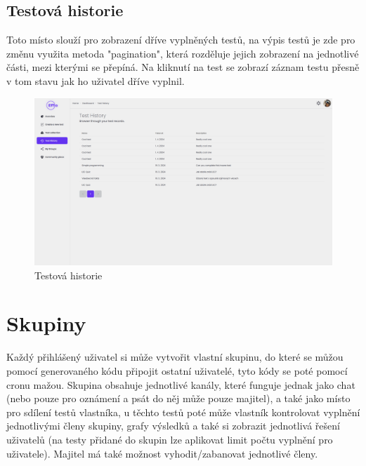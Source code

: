 \documentclass[12pt, a4paper,
openright
]{report}
\begin{document}
\subsection{Testová historie}
\label{subsec:historie}
Toto místo slouží pro zobrazení dříve vyplněných testů, na výpis testů je zde pro změnu využita metoda "pagination", která rozděluje jejich zobrazení na jednotlivé části, mezi kterými se přepíná. Na kliknutí na test se zobrazí záznam testu přesně v tom stavu jak ho uživatel dříve vyplnil.

\begin{figure}[H]
	\centering %
	\includegraphics[width=1\linewidth]{image/history.png} 
	\caption{Testová historie} %
	\label{fig:history} %
\end{figure}

\section{Skupiny}
Každý přihlášený uživatel si může vytvořit vlastní skupinu, do které se můžou pomocí generovaného kódu připojit ostatní uživatelé, tyto kódy se poté pomocí cronu mažou. Skupina obsahuje jednotlivé kanály, které funguje jednak jako chat (nebo pouze pro oznámení a psát do něj může pouze majitel), a také jako místo pro sdílení testů vlastníka, u těchto testů poté může vlastník kontrolovat vyplnění jednotlivými členy skupiny, grafy výsledků a také si zobrazit jednotlivá řešení uživatelů (na testy přidané do skupin lze aplikovat limit počtu vyplnění pro uživatele). Majitel má také možnost vyhodit/zabanovat jednotlivé členy.
\end{document}
